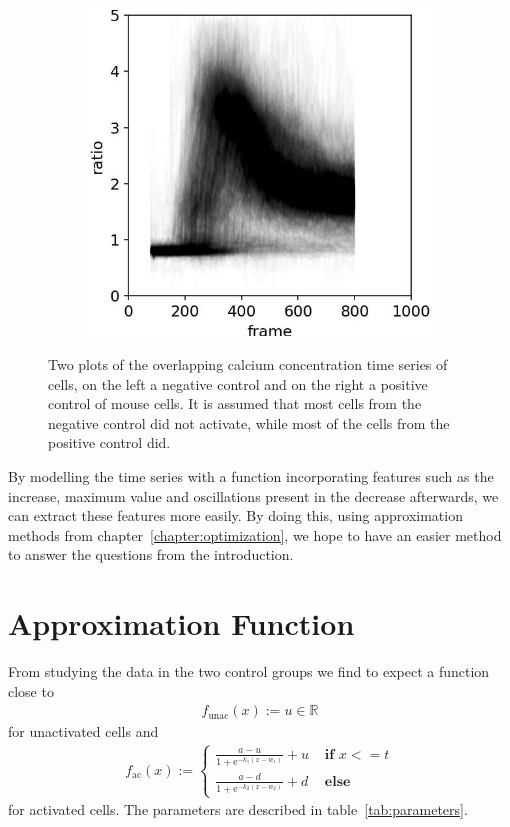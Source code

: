 \begin{figure}[h]
\begin{subfigure}{0.45\linewidth}
		\includegraphics[width=\textwidth]{fig/all_cells_overlayed_mouse_pos}
	\end{subfigure}
	
	\caption{Two plots of the overlapping calcium concentration time series of cells, on the left a negative control and on the right a positive control of mouse cells.
	It is assumed that most cells from the negative control did not activate, while most of the cells from the positive control did.
	}
	\label{fig:all_cells_overlayed}
\end{figure}

By modelling the time series with a function incorporating features such as the increase, maximum value and oscillations present in the decrease afterwards, we can extract these features more easily. By doing this, using approximation methods from chapter~\ref{chapter:optimization}, we hope to have an easier method to answer the questions from the introduction.

\newpage
\section{Approximation Function}

From studying the data in the two control groups we find to expect a function close to
\begin{align}
	\label{math:function_unactivated_cell}
	f_{\text{unac}}(x) := u \in \mathds{R}
\end{align}
for unactivated cells and
\begin{align}
	\label{math:function_activated_cell}
	f_{\text{ac}}(x) := \begin{cases}
		\frac{a-u}{1 + \text{e}^{-k_1(x-w_1)}} + u & \textbf{ if } x <= t\\
		\frac{a-d}{1 + \text{e}^{-k_2(x-w_2)}} + d & \textbf{ else}
	\end{cases}
\end{align}
for activated cells. The parameters are described in table~\ref{tab:parameters}.

